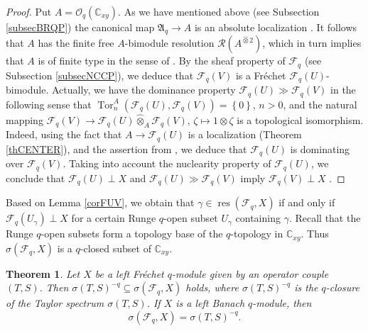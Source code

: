\documentclass[12pt,reqno]{amsart}%
\newtheorem{theorem}{Theorem}
\theoremstyle{plain}
\numberwithin{theorem}{section} \numberwithin{equation}{section}
\numberwithin{lemma}{section}
\numberwithin{remark}{section}
\numberwithin{example}{section}
\numberwithin{proposition}{section}
\numberwithin{definition}{section}
\numberwithin{corollary}{section}
\begin{document}
\begin{proof}
Put $A=\mathcal{O}_{q}\left(  \mathbb{C}_{xy}\right)  $. As we have mentioned
above (see Subsection \ref{subsecBRQP}) the canonical map $\mathfrak{A}%
_{q}\rightarrow A$ is an absolute localization \cite{Pir}. It follows that $A$
has the finite free $A$-bimodule resolution $\mathcal{R}\left(
A^{\widehat{\otimes}2}\right)  $, which in turn implies that $A$ is of finite
type in the sense of \cite[Definition 2.4]{Tay2}. By the sheaf property of
$\mathcal{F}_{q}$ (see Subsection \ref{subsecNCCP}), we deduce that
$\mathcal{F}_{q}\left(  V\right)  $ is a Fr\'{e}chet $\mathcal{F}_{q}\left(
U\right)  $-bimodule. Actually, we have the dominance property $\mathcal{F}%
_{q}\left(  U\right)  \gg\mathcal{F}_{q}\left(  V\right)  $ \cite[Definition
2.2]{Tay2} in the following sense that $\operatorname{Tor}_{n}^{A}\left(
\mathcal{F}_{q}\left(  U\right)  ,\mathcal{F}_{q}\left(  V\right)  \right)
=\left\{  0\right\}  $, $n>0$, and the natural mapping $\mathcal{F}_{q}\left(
V\right)  \rightarrow\mathcal{F}_{q}\left(  U\right)  \widehat{\otimes}%
_{A}\mathcal{F}_{q}\left(  V\right)  $, $\zeta\mapsto1\otimes\zeta$ is a
topological isomorphism. Indeed, using the fact that $A\rightarrow
\mathcal{F}_{q}\left(  U\right)  $ is a localization (Theorem \ref{thCENTER}),
and the assertion from \cite[Proposition 2.1]{Tay2}, we deduce that
$\mathcal{F}_{q}\left(  U\right)  $ is dominating over $\mathcal{F}_{q}\left(
V\right)  $. Taking into account the nuclearity property of $\mathcal{F}%
_{q}\left(  U\right)  $, we conclude that $\mathcal{F}_{q}\left(  U\right)
\perp X$ and $\mathcal{F}_{q}\left(  U\right)  \gg\mathcal{F}_{q}\left(
V\right)  $ imply $\mathcal{F}_{q}\left(  V\right)  \perp X$ \cite[Proposition
2.7 (b)]{Tay2}.
\end{proof}

Based on Lemma \ref{corFUV}, we obtain that $\gamma\in\operatorname*{res}%
\left(  \mathcal{F}_{q},X\right)  $ if and only if $\mathcal{F}_{q}\left(
U_{\gamma}\right)  \perp X$ for a certain Runge $q$-open subset $U_{\gamma}$
containing $\gamma$. Recall that the Runge $q$-open subsets form a topology
base of the $q$-topology in $\mathbb{C}_{xy}$. Thus $\sigma\left(
\mathcal{F}_{q},X\right)  $ is a $q$-closed subset of $\mathbb{C}_{xy}$.

\begin{theorem}
\label{corPT}Let $X$ be a left Fr\'{e}chet $q$-module given by an operator
couple $\left(  T,S\right)  $. Then $\sigma\left(  T,S\right)  ^{-q}%
\subseteq\sigma\left(  \mathcal{F}_{q},X\right)  $ holds, where $\sigma\left(
T,S\right)  ^{-q}$ is the $q$-closure of the Taylor spectrum $\sigma\left(
T,S\right)  $. If $X$ is a left Banach $q$-module, then
\[
\sigma\left(  \mathcal{F}_{q},X\right)  =\sigma\left(  T,S\right)  ^{-q}.
\]

\end{theorem}
\end{document}
